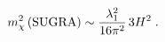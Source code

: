 \begin{equation}
\label{eq:sugra-tilt}
m_\chi^2\,({\rm SUGRA}) \sim \frac{\lambda_1^2}{16\pi^2}\, 3H^2 \;.
\end{equation}

